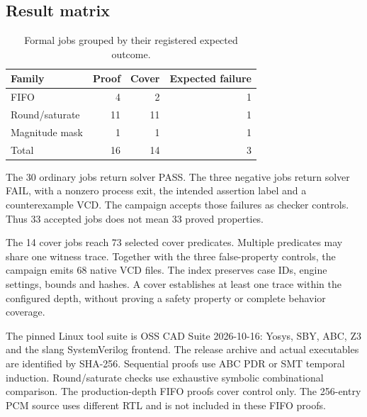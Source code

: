 \subsection{Result matrix}
\begin{table}[htbp]\centering
\caption{Formal jobs grouped by their registered expected outcome.}
\begin{tabularx}{\linewidth}{Lrrr}\toprule
Family & Proof & Cover & Expected failure\\\midrule
FIFO & 4 & 2 & 1\\
Round/saturate & 11 & 11 & 1\\
Magnitude mask & 1 & 1 & 1\\\midrule
Total & 16 & 14 & 3\\\bottomrule
\end{tabularx}\end{table}
The 30 ordinary jobs return solver PASS. The three negative jobs return solver FAIL, with a nonzero process exit, the intended assertion label and a counterexample VCD. The campaign accepts those failures as checker controls. Thus 33 accepted jobs does not mean 33 proved properties.

The 14 cover jobs reach 73 selected cover predicates. Multiple predicates may share one witness trace. Together with the three false-property controls, the campaign emits 68 native VCD files. The index preserves case IDs, engine settings, bounds and hashes. A cover establishes at least one trace within the configured depth, without proving a safety property or complete behavior coverage.

The pinned Linux tool suite is OSS CAD Suite 2026-10-16: Yosys, SBY, ABC, Z3 and the slang SystemVerilog frontend. The release archive and actual executables are identified by SHA-256. Sequential proofs use ABC PDR or SMT temporal induction. Round/saturate checks use exhaustive symbolic combinational comparison. The production-depth FIFO proofs cover control only. The 256-entry PCM source uses different RTL and is not included in these FIFO proofs.
